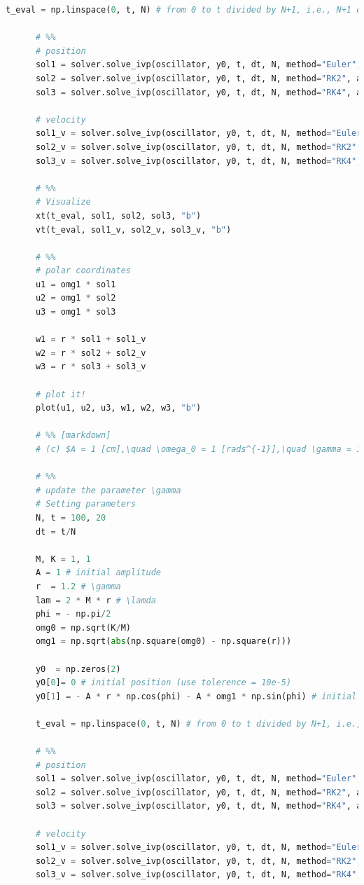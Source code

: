 \documentclass[12pt]{article}
\begin{document}
\begin{lstlisting}[language={Python}]
      t_eval = np.linspace(0, t, N) # from 0 to t divided by N+1, i.e., N+1 equal parts.

      # %%
      # position
      sol1 = solver.solve_ivp(oscillator, y0, t, dt, N, method="Euler", args=(lam, K, M))[0]
      sol2 = solver.solve_ivp(oscillator, y0, t, dt, N, method="RK2", args=(lam, K, M))[0]
      sol3 = solver.solve_ivp(oscillator, y0, t, dt, N, method="RK4", args=(lam, K, M))[0]

      # velocity
      sol1_v = solver.solve_ivp(oscillator, y0, t, dt, N, method="Euler", args=(lam, K, M))[1]
      sol2_v = solver.solve_ivp(oscillator, y0, t, dt, N, method="RK2", args=(lam, K, M))[1]
      sol3_v = solver.solve_ivp(oscillator, y0, t, dt, N, method="RK4", args=(lam, K, M))[1]

      # %%
      # Visualize
      xt(t_eval, sol1, sol2, sol3, "b")
      vt(t_eval, sol1_v, sol2_v, sol3_v, "b")

      # %%
      # polar coordinates
      u1 = omg1 * sol1
      u2 = omg1 * sol2
      u3 = omg1 * sol3

      w1 = r * sol1 + sol1_v
      w2 = r * sol2 + sol2_v
      w3 = r * sol3 + sol3_v

      # plot it!
      plot(u1, u2, u3, w1, w2, w3, "b")

      # %% [markdown]
      # (c) $A = 1 [cm],\quad \omega_0 = 1 [rads^{-1}],\quad \gamma = 1.2 [s^{-1}], \quad \phi = -\pi / 2 [rad]$

      # %%
      # update the parameter \gamma
      # Setting parameters
      N, t = 100, 20
      dt = t/N

      M, K = 1, 1
      A = 1 # initial amplitude
      r  = 1.2 # \gamma
      lam = 2 * M * r # \lamda
      phi = - np.pi/2
      omg0 = np.sqrt(K/M)
      omg1 = np.sqrt(abs(np.square(omg0) - np.square(r)))

      y0  = np.zeros(2)
      y0[0]= 0 # initial position (use tolerence = 10e-5)
      y0[1] = - A * r * np.cos(phi) - A * omg1 * np.sin(phi) # initial velocity

      t_eval = np.linspace(0, t, N) # from 0 to t divided by N+1, i.e., N+1 equal parts.

      # %%
      # position
      sol1 = solver.solve_ivp(oscillator, y0, t, dt, N, method="Euler", args=(lam, K, M))[0]
      sol2 = solver.solve_ivp(oscillator, y0, t, dt, N, method="RK2", args=(lam, K, M))[0]
      sol3 = solver.solve_ivp(oscillator, y0, t, dt, N, method="RK4", args=(lam, K, M))[0]

      # velocity
      sol1_v = solver.solve_ivp(oscillator, y0, t, dt, N, method="Euler", args=(lam, K, M))[1]
      sol2_v = solver.solve_ivp(oscillator, y0, t, dt, N, method="RK2", args=(lam, K, M))[1]
      sol3_v = solver.solve_ivp(oscillator, y0, t, dt, N, method="RK4", args=(lam, K, M))[1]


\end{lstlisting}
\end{document}
